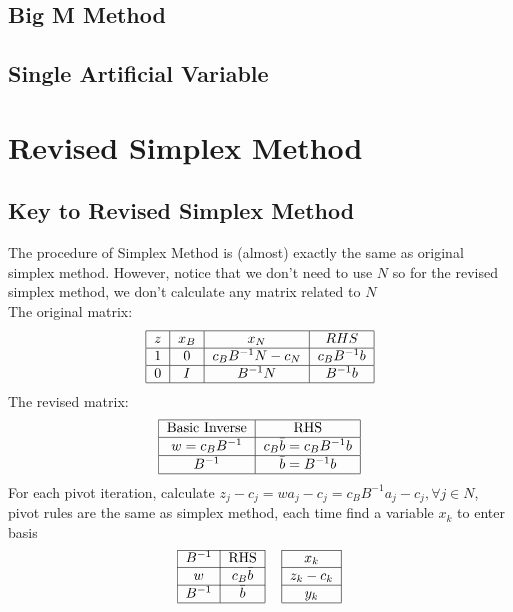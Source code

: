 			\subsection{Big M Method}

			\subsection{Single Artificial Variable}

		\section{Revised Simplex Method}
			\subsection{Key to Revised Simplex Method}
				The procedure of Simplex Method is (almost) exactly the same as original simplex method. However, notice that we don't need to use $N$ so for the revised simplex method, we don't calculate any matrix related to $N$\\
				The original matrix:
				\begin{align}
					\begin{tabular} {|c|c|c|c|}
						\hline
						$z$ & $x_B$ & $x_N$ & $RHS$ \\
						\hline
						1 & 0 & $c_BB^{-1}N - c_N$ & $c_BB^{-1}b$ \\
						\hline
						0 & $I$ & $B^{-1}N$ & $B^{-1}b$ \\
						\hline
					\end{tabular} 
				\end{align}
				The revised matrix:
				\begin{align}
					\begin{tabular} {|c|c|}
						\hline
						Basic Inverse & RHS \\
						\hline
						$w=c_BB^{-1}$ & $c_B\bar{b} = c_BB^{-1}b$\\
						\hline
						$B^{-1}$ & $\bar{b} = B^{-1}b$\\
						\hline
					\end{tabular} 
				\end{align}
				For each pivot iteration, calculate $z_j - c_j = wa_j - c_j = c_BB^{-1}a_j - c_j, \forall j\in N$, pivot rules are the same as simplex method, each time find a variable $x_k$ to enter basis
				\begin{align}
					\begin{tabular}{|c|c|c|c|}
						\cline{1-2} \cline{4-4} $B^{-1}$ & RHS & & $x_k$ \\
						\cline{1-2} \cline{4-4} $w$ & $c_B\bar{b}$ & & $z_k-c_k$ \\
						\cline{1-2} \cline{4-4} $B^{-1}$ & $\bar{b}$ & & $y_k$ \\
						\cline{1-2} \cline{4-4}
					\end{tabular} 
				\end{align}
